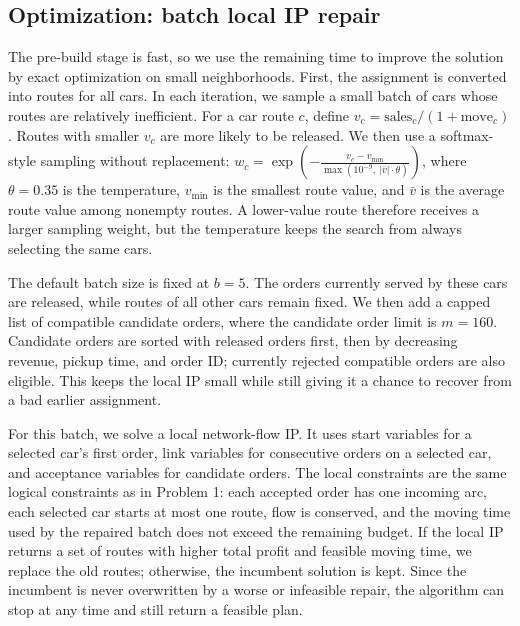 \documentclass[10pt,a4paper]{article}
\begin{document}
\subsection*{Optimization: batch local IP repair}

The pre-build stage is fast, so we use the remaining time to improve the
solution by exact optimization on small neighborhoods.  First, the assignment is
converted into routes for all cars.  In each iteration, we sample a small batch
of cars whose routes are relatively inefficient.  For a car route $c$, define
$v_c=\text{sales}_c/(1+\text{move}_c)$.
Routes with smaller $v_c$ are more likely to be released. We then
use a softmax-style sampling without replacement:
$w_c=\exp\!\left(-\frac{v_c-v_{\min}}{\max(10^{-9},\ |\bar v|\cdot \theta)}\right)$,
where $\theta=0.35$ is the temperature, $v_{\min}$ is the smallest route value,
and $\bar v$ is the average route value among nonempty routes.  A lower-value
route therefore receives a larger sampling weight, but the temperature keeps
the search from always selecting the same cars.

The default batch size is fixed at $b=5$. The orders currently served by these cars are released, while routes of all other cars remain fixed. We then add a capped list of compatible candidate orders, where the candidate order limit is $m = 160$. Candidate orders are sorted with
released orders first, then by decreasing revenue, pickup time, and order ID;
currently rejected compatible orders are also eligible.  This keeps the local IP
small while still giving it a chance to recover from a bad earlier assignment.

For this batch, we solve a local network-flow IP.  It uses start variables for a
selected car's first order, link variables for consecutive orders on a selected
car, and acceptance variables for candidate orders.  The local constraints are
the same logical constraints as in Problem 1: each accepted order has one
incoming arc, each selected car starts at most one route, flow is conserved, and
the moving time used by the repaired batch does not exceed the remaining budget.
If the local IP returns a set of routes with higher total profit and feasible
moving time, we replace the old routes; otherwise, the incumbent solution is
kept.  Since the incumbent is never overwritten by a worse or infeasible repair,
the algorithm can stop at any time and still return a feasible plan.
\end{document}
